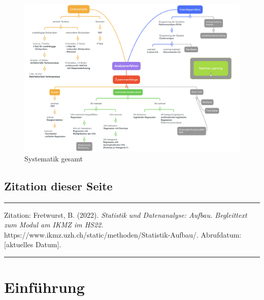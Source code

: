 \documentclass[
  10pt,
  letterpaper,
  a4paper, twoside]{scrreprt}
\begin{document}
\begin{figure}[H]

{\centering \includegraphics[width=1\textwidth,height=\textheight]{images/Analyseschema-total2.png}

}

\caption{Systematik gesamt}

\end{figure}%

\section*{Zitation dieser Seite}\label{zitation-dieser-seite}


\begin{center}\rule{0.5\linewidth}{0.5pt}\end{center}

Zitation: Fretwurst, B. (2022). \emph{Statistik und Datenanalyse:
Aufbau. Begleittext zum Modul am IKMZ im HS22.}
https://www.ikmz.uzh.ch/static/methoden/Statistik-Aufbau/. Abrufdatum:
{[}aktuelles Datum{]}.

\begin{center}\rule{0.5\linewidth}{0.5pt}\end{center}


\chapter{Einführung}\label{einfuxfchrung}
\end{document}
